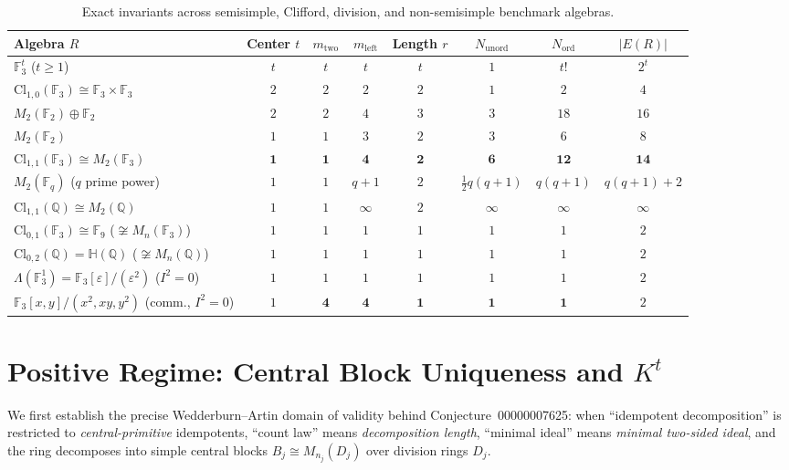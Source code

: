 \documentclass[11pt]{article}
\theoremstyle{definition}
\newcommand{\Cl}{\mathrm{Cl}}
\newcommand{\Mat}{M}
\newcommand{\F}{\mathbb{F}}
\newcommand{\Q}{\mathbb{Q}}
\newcommand{\HH}{\mathbb{H}}
\begin{document}
\begin{table}[ht]
\centering
\footnotesize
\setlength{\tabcolsep}{4.5pt}
\caption{Exact invariants across semisimple, Clifford, division, and
non-semisimple benchmark algebras.}
\label{tab:invariants}
\vspace{4pt}
\begin{tabular}{@{}lccccccc@{}}
\toprule
Algebra $R$ & Center $t$ & $m_{\mathrm{two}}$ & $m_{\mathrm{left}}$ & Length $r$ & $N_{\mathrm{unord}}$ & $N_{\mathrm{ord}}$ & $|E(R)|$ \\
\midrule
$\F_3^t$ ($t \ge 1$) & $t$ & $t$ & $t$ & $t$ & $1$ & $t!$ & $2^t$ \\
$\Cl_{1,0}(\F_3) \cong \F_3 \times \F_3$ & $2$ & $2$ & $2$ & $2$ & $1$ & $2$ & $4$ \\
$\Mat_2(\F_2) \oplus \F_2$ & $2$ & $2$ & $4$ & $3$ & $3$ & $18$ & $16$ \\
$\Mat_2(\F_2)$ & $1$ & $1$ & $3$ & $2$ & $3$ & $6$ & $8$ \\
$\Cl_{1,1}(\F_3) \cong \Mat_2(\F_3)$ & $\mathbf{1}$ & $\mathbf{1}$ & $\mathbf{4}$ & $\mathbf{2}$ & $\mathbf{6}$ & $\mathbf{12}$ & $\mathbf{14}$ \\
$\Mat_2(\F_q)$ ($q$ prime power) & $1$ & $1$ & $q+1$ & $2$ & $\tfrac{1}{2}q(q+1)$ & $q(q+1)$ & $q(q+1)+2$ \\
$\Cl_{1,1}(\Q) \cong \Mat_2(\Q)$ & $1$ & $1$ & $\infty$ & $2$ & $\infty$ & $\infty$ & $\infty$ \\
$\Cl_{0,1}(\F_3) \cong \F_9$ ($\not\cong \Mat_n(\F_3)$) & $1$ & $1$ & $1$ & $1$ & $1$ & $1$ & $2$ \\
$\Cl_{0,2}(\Q) = \HH(\Q)$ ($\not\cong \Mat_n(\Q)$) & $1$ & $1$ & $1$ & $1$ & $1$ & $1$ & $2$ \\
$\Lambda(\F_3^1) = \F_3[\varepsilon]/(\varepsilon^2)$ ($I^2 = 0$) & $1$ & $1$ & $1$ & $1$ & $1$ & $1$ & $2$ \\
$\F_3[x,y]/(x^2,xy,y^2)$ (comm., $I^2 = 0$) & $1$ & $\mathbf{4}$ & $\mathbf{4}$ & $\mathbf{1}$ & $\mathbf{1}$ & $\mathbf{1}$ & $2$ \\
\bottomrule
\end{tabular}
\end{table}

\section{Positive Regime: Central Block Uniqueness and \texorpdfstring{$K^t$}{K\^t}}

We first establish the precise Wedderburn--Artin domain of validity behind
Conjecture~00000007625: when ``idempotent decomposition'' is restricted to
\emph{central-primitive} idempotents, ``count law'' means \emph{decomposition
length}, ``minimal ideal'' means \emph{minimal two-sided ideal}, and the ring
decomposes into simple central blocks $B_j \cong \Mat_{n_j}(D_j)$ over division
rings $D_j$.
\end{document}
